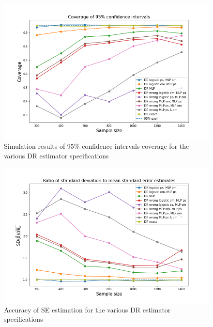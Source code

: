 \documentclass[12pt,twoside]{article}
\begin{document}
\begin{figure}[h!]
    \centering
    \includegraphics[width = 0.9\columnwidth]{figures/CIMLP.png}
    \caption{Simulation results of 95\% confidence intervals coverage for the various DR estimator specifications}
    \label{figCIMLP}
\end{figure}

\begin{figure}[h!]
    \centering
    \includegraphics[width = 0.9\columnwidth]{figures/SEMLP.png}
    \caption{Accuracy of \citet{lunceford_davidian} SE estimation for the various DR estimator specifications}
    \label{figSEMLP}
\end{figure}
\end{document}
